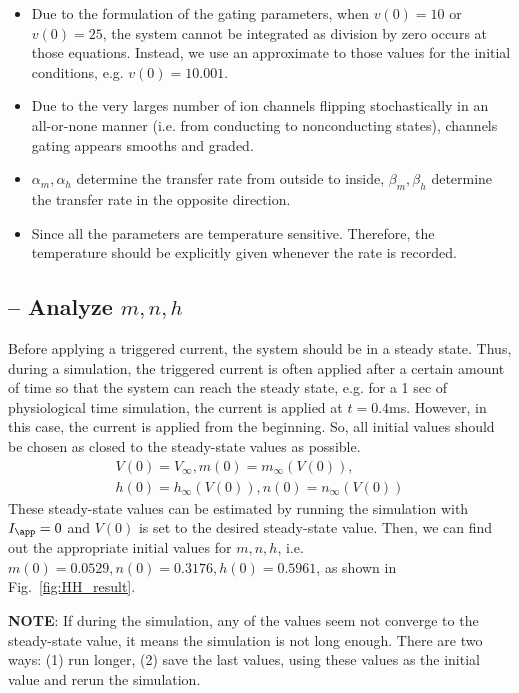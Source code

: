 \begin{itemize}
\item Due to the formulation of the gating parameters, when $v(0)=10$
  or $v(0)=25$, the system cannot be integrated as division by zero
  occurs at those equations. Instead, we use an approximate to those
  values for the initial conditions, e.g. $v(0)=10.001$. 

\item Due to the very larges number of ion channels flipping
  stochastically in an all-or-none manner (i.e. from conducting to
  nonconducting states), channels gating appears smooths and graded.


\item $\alpha_m, \alpha_h$ determine the transfer rate from outside
  to inside, $\beta_m, \beta_h$ determine the transfer rate in the
  opposite direction.

\item Since all the parameters are temperature sensitive. Therefore,
  the temperature should be explicitly given whenever the rate is
  recorded.

\end{itemize}



\subsection{-- Analyze $m, n, h$}
\label{sec:analyze-m-n}

Before applying a triggered current, the system should be in a steady
state. Thus, during a simulation, the triggered current is often
applied after a certain amount of time so that the system can reach
the steady state, e.g. for a 1 sec of physiological time simulation,
the current is applied at $t=0.4$ms. However, in this case, the
current is applied from the beginning. So, all initial values should
be chosen as closed to the steady-state values as possible.
\begin{eqnarray}
  \label{eq:579}
  V(0)=V_\infty, m(0)=m_\infty(V(0)), \\
  h(0)=h_\infty(V(0)), n(0)=n_\infty(V(0))
\end{eqnarray}
These steady-state values can be estimated by running the simulation
with $I_\app = 0$ and $V(0)$ is set to the desired steady-state
value. Then, we can find out the appropriate initial values for $m, n,
h$, i.e. $m(0)=0.0529, n(0)=0.3176,h(0)=0.5961$, as shown in
Fig.~\ref{fig:HH_result}.

{\bf NOTE}: If during the simulation, any of the values seem not 
converge to the steady-state value, it means the simulation is not
long enough. There are two ways: (1) run longer, (2) save the last
values, using these values as the initial value and rerun the
simulation.

